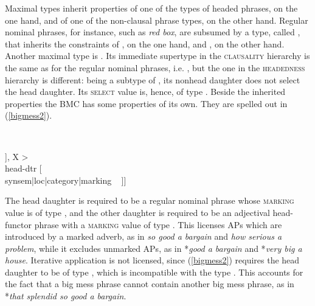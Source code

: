 \documentclass[output=paper
	        ,collection
	        ,collectionchapter
 	        ,biblatex
                ,babelshorthands
                ,newtxmath
                ,draftmode
                ,colorlinks, citecolor=brown
]{langscibook}
\begin{document}
Maximal types inherit properties of one of the types of headed phrases,
on the one hand, and of one of the non-clausal phrase types, on the other hand.  
Regular nominal phrases, for instance, such as \emph{red box}, are subsumed 
by a type, called , that inherits the 
constraints of , on the one hand, and 
, on the other hand.  
Another maximal type is . 
Its immediate supertype in the \textsc{clausality} hierarchy is the same 
as for the regular nominal phrases, i.e. , 
but the one in the \textsc{headedness} hierarchy is different: 
being a subtype of , 
its nonhead daughter does not select the head daughter. Its \textsc{select} 
value is, hence, of type . 
Beside the inherited properties the BMC has some properties of its own.   
They are spelled out in (\ref{bigmess2}).

\begin{exe}
\ex\label{bigmess2} 
 ~ \impl ~ 
\begin{avm}
 [ dtrs ~ <[\type{head-functor-phrase}                           \\
            synsem|loc|category [head    & \type{adjective}      \\
                                 marking & \type{marked}]], X > \\
 head-dtr [                         \\
           synsem|loc|category|marking ~ ]]
\end{avm}
\end{exe}

\noindent
The head daughter is required to be a regular nominal phrase 
whose \textsc{marking} value is of type , and the other daughter 
is required to be an adjectival head-functor phrase
with a \textsc{marking} value of type . 
This licenses APs which are introduced by a marked adverb, 
as in \emph{so good a bargain} and \emph{how serious a problem}, 
while it excludes unmarked APs, as in 
*\emph{good a bargain} and *\emph{very big a house}.
Iterative application is not licensed, since (\ref{bigmess2}) requires the 
head daughter to be of type , which is incompatible with the type 
. This accounts for the fact that a big
mess phrase cannot contain another big mess phrase, as in
*\emph{that splendid so good a bargain}.
\end{document}
